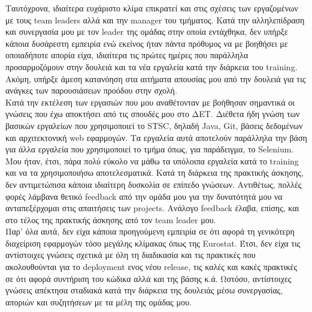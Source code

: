Ταυτόχρονα, ιδιαίτερα ευχάριστο κλίμα επικρατεί και στις σχέσεις των εργαζομένων με τους team leaders αλλά και την manager του τμήματος. Κατά την αλληλεπίδραση και συνεργασία μου με τον leader της 
ομάδας στην οποία εντάχθηκα, δεν υπήρξε κάποια δυσάρεστη εμπειρία ενώ εκείνος ήταν πάντα πρόθυμος να με βοηθήσει με οποιαδήποτε απορία είχα, ιδιαίτερα τις πρώτες ημέρες που παράλληλα προσαρμοζόμουν 
στην δουλειά και τα νέα εργαλεία κατά την διάρκεια του training. Ακόμη, υπήρξε άμεση κατανόηση στα αιτήματα απουσίας μου από την δουλειά για τις ανάγκες των παρουσιάσεων προόδου στην σχολή.\\

Κατά την εκτέλεση των εργασιών που μου αναθέτονταν με βοήθησαν σημαντικά οι γνώσεις που έχω αποκτήσει από τις σπουδές μου στο ΔΕΤ. Διέθετα ήδη γνώση των βασικών εργαλείων που χρησιμοποιεί το STSC, δηλαδή 
Java, Git, βάσεις δεδομένων και αρχιτεκτονική web εφαρμογών. Τα εργαλεία αυτά αποτελούν παράλληλα την βάση για άλλα εργαλεία που χρησιμοποιεί το τμήμα όπως, για παράδειγμα, το Selenium. Μου ήταν, έτσι, πάρα πολύ 
εύκολο να μάθω τα υπόλοιπα εργαλεία κατά το training και να τα χρησιμοποιήσω αποτελεσματικά. Κατά τη διάρκεια της πρακτικής άσκησης, δεν αντιμετώπισα κάποια ιδιαίτερη δυσκολία σε επίπεδο γνώσεων. Αντιθέτως, πολλές 
φορές λάμβανα θετικό feedback από την ομάδα μου για την δυνατότητά μου να ανταπεξέρχομαι στις απαιτήσεις των projects. Ανάλογο feedback έλαβα, επίσης, και στο τέλος της πρακτικής άσκησης από τον team leader μου.\\

Παρ' όλα αυτά, δεν είχα κάποια προηγούμενη εμπειρία σε ότι αφορά τη γενικότερη διαχείριση εφαρμογών τόσο μεγάλης κλίμακας όπως της Eurostat. Έτσι, δεν είχα τις αντίστοιχες γνώσεις σχετικά με όλη τη 
διαδικασία και τις πρακτικές που ακολουθούνται για το deployment ενος νέου release, τις καλές και κακές πρακτικές σε ότι αφορά συντήριση του κώδικα αλλά και της βάσης κ.ά. Ωστόσο, αντίστοιχες γνώσεις 
απέκτησα σταδιακά κατά την διάρκεια της δουλειάς μέσω συνεργασίας, αποριών και συζητήσεων με τα μέλη της ομάδας μου.

